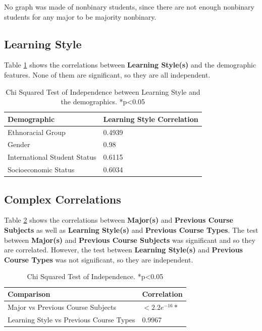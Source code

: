 \documentclass{article}
\begin{document}
No graph was made of nonbinary students, since there are not enough nonbinary students for any major to be majority nonbinary.

\subsection{Learning Style}\label{learning-style-1}

\label{sec:learning_style_res}

Table \ref{tab:learning_style_chi_indep} shows the correlations between \textbf{Learning Style(s)} and the demographic features. None of them are significant, so they are all independent.

\begin{table}[htbp]
  \centering
  \begin{tabular}{|l|l|}
    \hline
    \textbf{Demographic} & \textbf{Learning Style Correlation} \\ \hline
    Ethnoracial Group & 0.4939 \\ \hline
    Gender & 0.98 \\ \hline
    International Student Status & 0.6115 \\ \hline
    Socioeconomic Status & 0.6034 \\ \hline
  \end{tabular}
  \caption{Chi Squared Test of Independence between Learning Style and the demographics. *p<0.05}
  \label{tab:learning_style_chi_indep}
\end{table}

\subsection{Complex Correlations}\label{complex-correlations-1}

\label{sec:complex_correlations_res}

Table \ref{tab:complex_chi_indep} shows the correlations between \textbf{Major(s)} and \textbf{Previous Course Subjects} as well as \textbf{Learning Style(s)} and \textbf{Previous Course Types}. The test between \textbf{Major(s)} and \textbf{Previous Course Subjects} was significant and so they are correlated. However, the test between \textbf{Learning Style(s)} and \textbf{Previous Course Types} was not significant, so they are independent.

\begin{table}[htbp]
  \centering
  \begin{tabular}{|l|l|}
    \hline
    \textbf{Comparison} & \textbf{Correlation} \\ \hline
    Major vs Previous Course Subjects & $<2.2e^{-16}*$ \\ \hline
    Learning Style vs Previous Course Types & 0.9967 \\ \hline
  \end{tabular}
  \caption{Chi Squared Test of Independence. *p<0.05}
  \label{tab:complex_chi_indep}
\end{table}
\end{document}
